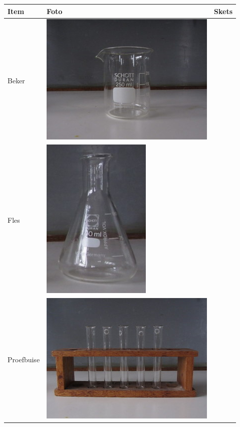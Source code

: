 \begin{table}[H]
\begin{center}
\begin{tabular}{|l|m{3cm}|m{3cm}|}\hline
   \textbf{Item} & \textbf{Foto} & \textbf{Skets} \\ \hline
Beker & \includegraphics[width=.2\textwidth]{photos/beaker.jpg} & \scalebox{.4}{\begin{pspicture}(0,0)(5,5) \pstTubeEssais[glassType=becher] \end{pspicture}} \\ \hline
Fles & \includegraphics[width=.05\textheight]{photos/flask.JPG} & \scalebox{.4}{\begin{pspicture}(0,0)(5,5) \pstTubeEssais[glassType=erlen] \end{pspicture}} \\ \hline 
Proefbuise & \includegraphics[width=.2\textwidth]{photos/testtubes.jpg} & \scalebox{.4}{\begin{pspicture}(0,0)(5,5) \pstTubeEssais \end{pspicture}} \\ \hline

\end{tabular}
\end{center}
\end{table}
